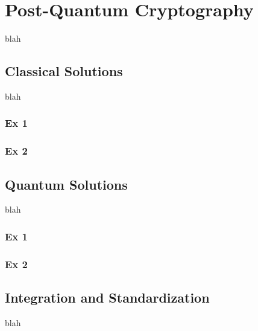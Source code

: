 \section{Post-Quantum Cryptography}
blah

\subsection{Classical Solutions}
blah

\subsubsection{Ex 1}

\subsubsection{Ex 2}

\subsection{Quantum Solutions}
blah

\subsubsection{Ex 1}

\subsubsection{Ex 2}

\subsection{Integration and Standardization}
blah